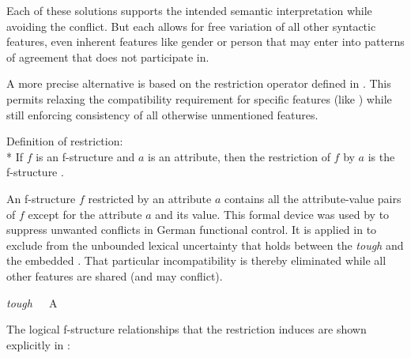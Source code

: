 \documentclass[output=paper,hidelinks]{langscibook}
\begin{document}
\noindent Each of these solutions supports the intended semantic interpretation while avoiding the \CASE conflict. But each allows for free variation of all other syntactic features, even inherent features like gender or person that may enter into patterns of agreement that \CASE does not participate in.

A more precise alternative is based on the restriction operator defined in .  This permits relaxing the compatibility requirement for specific features (like \CASE) while still enforcing consistency of all otherwise unmentioned features.  


\ea\label{restriction}
Definition of restriction: \hsp{1em} \citep{kaplanwedekind93} \\*
If $f$ is an f-structure and $a$ is an attribute, then the restriction of $f$ by $a$ is the f-structure .
\z

\noindent An f-structure $f$ restricted by an attribute $a$ contains all the attribute-value pairs of $f$ except for the attribute $a$ and its value.  This formal device was used by \citet{ZaenenKaplan2002:Subsumption} to suppress unwanted \CASE conflicts in German functional control. It is applied in  to exclude \CASE from the unbounded lexical uncertainty that holds between the  \textit{tough} \SUBJ and the embedded \OBJ. That particular incompatibility is thereby eliminated while all other features are shared (and may conflict).

\ea\label{toughrestrict}
\textit{tough}\ \ \ A\ \ \ 
\z

\noindent The logical f-structure relationships that the \CASE restriction induces are shown explicitly in :
\end{document}
